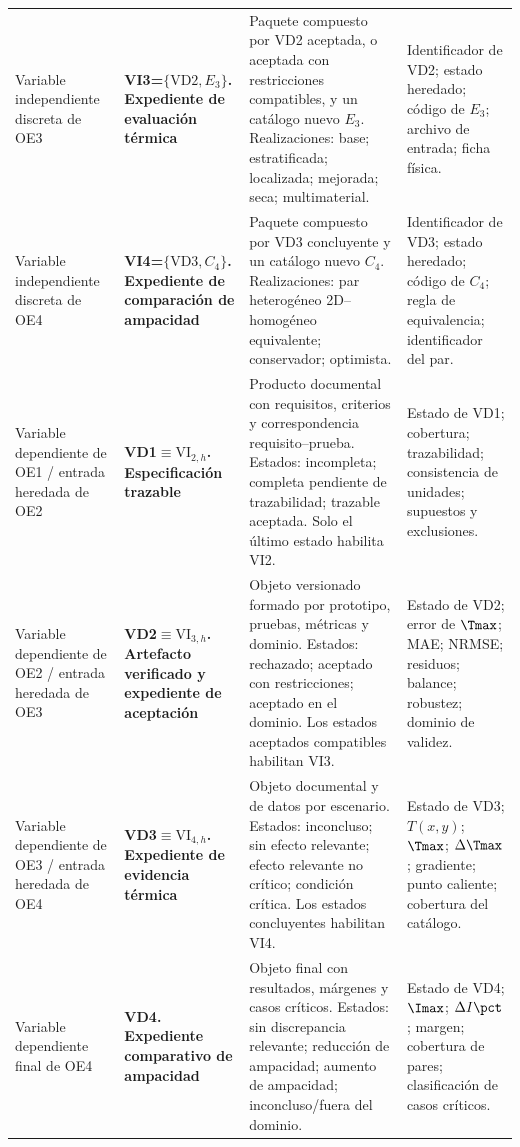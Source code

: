 \begin{longtable}{L{4.00cm}L{4.20cm}L{8.20cm}L{6.30cm}}
Variable independiente discreta de OE3 & \textbf{VI3=$\{\mathrm{VD2},E_3\}$. Expediente de evaluación térmica} & Paquete compuesto por VD2 aceptada, o aceptada con restricciones compatibles, y un catálogo nuevo $E_3$. Realizaciones: base; estratificada; localizada; mejorada; seca; multimaterial. & Identificador de VD2; estado heredado; código de $E_3$; archivo de entrada; ficha física. \\

Variable independiente discreta de OE4 & \textbf{VI4=$\{\mathrm{VD3},C_4\}$. Expediente de comparación de ampacidad} & Paquete compuesto por VD3 concluyente y un catálogo nuevo $C_4$. Realizaciones: par heterogéneo 2D--homogéneo equivalente; conservador; optimista. & Identificador de VD3; estado heredado; código de $C_4$; regla de equivalencia; identificador del par. \\

Variable dependiente de OE1 / entrada heredada de OE2 & \textbf{VD1$\equiv\mathrm{VI}_{2,h}$. Especificación trazable} & Producto documental con requisitos, criterios y correspondencia requisito--prueba. Estados: incompleta; completa pendiente de trazabilidad; trazable aceptada. Solo el último estado habilita VI2. & Estado de VD1; cobertura; trazabilidad; consistencia de unidades; supuestos y exclusiones. \\

Variable dependiente de OE2 / entrada heredada de OE3 & \textbf{VD2$\equiv\mathrm{VI}_{3,h}$. Artefacto verificado y expediente de aceptación} & Objeto versionado formado por prototipo, pruebas, métricas y dominio. Estados: rechazado; aceptado con restricciones; aceptado en el dominio. Los estados aceptados compatibles habilitan VI3. & Estado de VD2; error de $\Tmax$; MAE; NRMSE; residuos; balance; robustez; dominio de validez. \\

Variable dependiente de OE3 / entrada heredada de OE4 & \textbf{VD3$\equiv\mathrm{VI}_{4,h}$. Expediente de evidencia térmica} & Objeto documental y de datos por escenario. Estados: inconcluso; sin efecto relevante; efecto relevante no crítico; condición crítica. Los estados concluyentes habilitan VI4. & Estado de VD3; $T(x,y)$; $\Tmax$; $\Delta\Tmax$; gradiente; punto caliente; cobertura del catálogo. \\

Variable dependiente final de OE4 & \textbf{VD4. Expediente comparativo de ampacidad} & Objeto final con resultados, márgenes y casos críticos. Estados: sin discrepancia relevante; reducción de ampacidad; aumento de ampacidad; inconcluso/fuera del dominio. & Estado de VD4; $\Imax$; $\Delta I\pct$; margen; cobertura de pares; clasificación de casos críticos. \\


\end{longtable}
